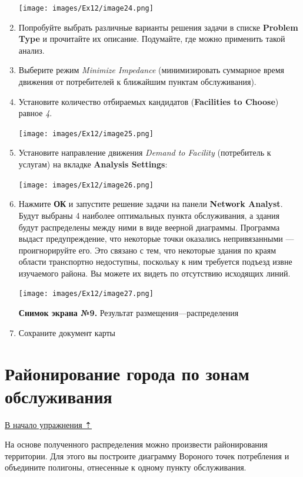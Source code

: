 \documentclass[12pt,]{book}
\begin{document}
\begin{enumerate}
  \texttt{[image: images/Ex12/image24.png]}
\item
  Попробуйте выбрать различные варианты решения задачи в списке \textbf{Problem Type} и прочитайте их описание. Подумайте, где можно применить такой анализ.
\item
  Выберите режим \emph{Minimize Impedance} (минимизировать суммарное время движения от потребителей к ближайшим пунктам обслуживания).
\item
  Установите количество отбираемых кандидатов (\textbf{Facilities to Choose}) равное \emph{4}.

  \texttt{[image: images/Ex12/image25.png]}
\item
  Установите направление движения \emph{Demand to Facility} (потребитель к услугам) на вкладке \textbf{Analysis Settings}:

  \texttt{[image: images/Ex12/image26.png]}
\item
  Нажмите \textbf{ОК} и запустите решение задачи на панели \textbf{Network Analyst}. Будут выбраны 4 наиболее оптимальных пункта обслуживания, а здания будут распределены между ними в виде веерной диаграммы. Программа выдаст предупреждение, что некоторые точки оказались непривязанными --- проигнорируйте его. Это связано с тем, что некоторые здания по краям области транспортно недоступны, поскольку к ним требуется подъезд извне изучаемого района. Вы можете их видеть по отсутствию исходящих линий.

  \texttt{[image: images/Ex12/image27.png]}

  \textbf{Снимок экрана №9.} Результат размещения---распределения
\item
  Сохраните документ карты
\end{enumerate}

\hypertarget{network-analysis-zoning}{%
\section{Районирование города по зонам обслуживания}\label{network-analysis-zoning}}

\protect\hyperlink{network-analysis}{В начало упражнения ⇡}

На основе полученного распределения можно произвести районирования территории. Для этого вы построите диаграмму Вороного точек потребления и объедините полигоны, отнесенные к одному пункту обслуживания.
\end{document}
